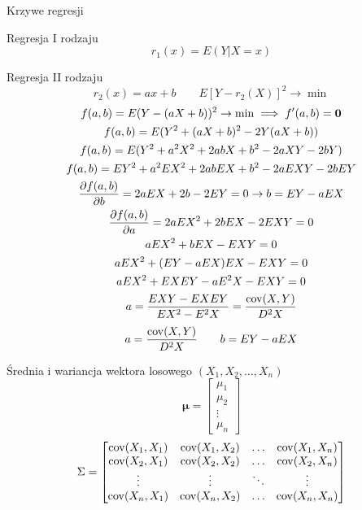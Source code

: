 \documentclass{mp}
\begin{document}
\begin{frame}{Krzywe regresji}
\begin{block}{Regresja I rodzaju}
\[ r_1(x)=E(Y|X=x)  \]
\end{block}
\pause
\begin{block}{Regresja II rodzaju}
\[ r_2(x)=ax+b \qquad E\left[Y-r_2(X)\right]^2\to\min \]
{
	\footnotesize
	\begin{gather*}
	f(a,b)=E(Y-(aX+b))^2\to\min \implies f'(a,b)=\bm{0} \\
	f(a,b)=E(Y^2+(aX+b)^2-2Y(aX+b))\\
	f(a,b)=E(Y^2+a^2X^2+2abX+b^2-2aXY-2bY)\\
	f(a,b)=EY^2+a^2EX^2+2abEX+b^2-2aEXY-2bEY \\
	\frac{\partial f(a,b)}{\partial b}=2aEX+2b-2EY=0 \to b=EY-aEX \\
	\frac{\partial f(a,b)}{\partial a}=2aEX^2+2bEX-2EXY=0 \\
	aEX^2+bEX-EXY=0 \\
	aEX^2+(EY-aEX)EX-EXY=0 \\
	aEX^2+EXEY-aE^2X-EXY=0 \\
	a=\frac{EXY-EXEY}{EX^2-E^2X}=\frac{\operatorname{cov}(X,Y)}{D^2X} \\
	\end{gather*}
}
\pause
\[ a=\frac{\operatorname{cov}(X,Y)}{D^2X} \qquad b=EY-aEX \]
\end{block}
\end{frame}
\begin{frame}{Średnia i wariancja wektora losowego $(X_1,X_2,\ldots,X_n)$}
\[ \bm{\mu}=\begin{bmatrix} \mu_1 \\ \mu_2 \\ \vdots \\ \mu_n \end{bmatrix} \]
\[ \Sigma=\begin{bmatrix}
\operatorname{cov}(X_1,X_1) & \operatorname{cov}(X_1,X_2) & \ldots & \operatorname{cov}(X_1,X_n) \\
\operatorname{cov}(X_2,X_1) & \operatorname{cov}(X_2,X_2) & \ldots & \operatorname{cov}(X_2,X_n) \\
\vdots & \vdots & \ddots & \vdots \\
\operatorname{cov}(X_n,X_1) & \operatorname{cov}(X_n,X_2) & \ldots & \operatorname{cov}(X_n,X_n) \\
\end{bmatrix} \]
\end{frame}


\end{document}
